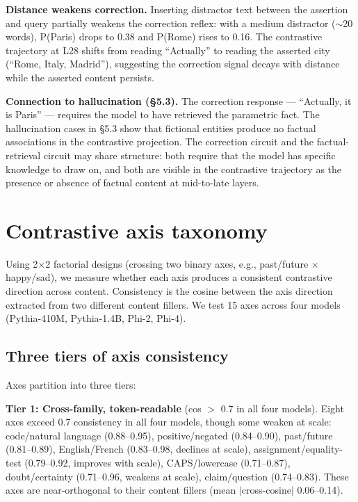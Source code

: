 \documentclass[11pt]{article}
\begin{document}
\textbf{Distance weakens correction.} Inserting distractor text between the
assertion and query partially weakens the correction reflex: with a medium
distractor ($\sim$20 words), P(Paris) drops to 0.38 and P(Rome) rises to 0.16.
The contrastive trajectory at L28 shifts from reading ``Actually'' to reading
the asserted city (``Rome, Italy, Madrid''), suggesting the correction signal
decays with distance while the asserted content persists.

\textbf{Connection to hallucination (\S5.3).} The correction response --- ``Actually,
it is Paris'' --- requires the model to have retrieved the parametric fact.
The hallucination cases in \S5.3 show that fictional entities produce no
factual associations in the contrastive projection. The correction circuit
and the factual-retrieval circuit may share structure: both require that the
model has specific knowledge to draw on, and both are visible in the
contrastive trajectory as the presence or absence of factual content at
mid-to-late layers.

\section{Contrastive axis taxonomy}

Using 2$\times$2 factorial designs (crossing two binary axes, e.g., past/future $\times$
happy/sad), we measure whether each axis produces a consistent contrastive
direction across content. Consistency is the cosine between the axis direction
extracted from two different content fillers. We test 15 axes across four models
(Pythia-410M, Pythia-1.4B, Phi-2, Phi-4).

\subsection{Three tiers of axis consistency}

Axes partition into three tiers:

\textbf{Tier 1: Cross-family, token-readable} (cos $>$ 0.7 in all four models).
Eight axes exceed 0.7 consistency in all four models, though some weaken at
scale: code/natural language (0.88--0.95), positive/negated (0.84--0.90),
past/future (0.81--0.89), English/French (0.83--0.98, declines at scale),
assignment/equality-test (0.79--0.92, improves with scale),
CAPS/lowercase (0.71--0.87), doubt/certainty (0.71--0.96, weakens at scale),
claim/question (0.74--0.83). These axes are near-orthogonal to their content fillers
(mean $|$cross-cosine$|$ 0.06--0.14).
\end{document}
